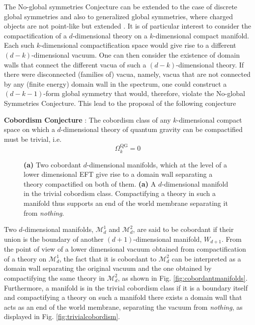 \documentclass[11pt,a4paper]{article}
\begin{document}
The No-global symmetries Conjecture can be extended to the case of discrete global symmetries and also to generalized global symmetries, where charged objects are not point-like but extended \cite{Gaiotto:2014kfa,Heidenreich:2020pkc,Heidenreich:2021tna}. It is of particular interest to consider the compactification of a $d$-dimensional theory on a $k$-dimensional compact manifold. Each such $k$-dimensional compactification space would give rise to a different $(d-k)$-dimensional  vacuum. One can then consider the existence of domain walls that connect the different vacua of such a $(d-k)$-dimensional theory. If there were disconnected (families of) vacua, namely, vacua that are not connected by any (finite energy) domain wall in the spectrum, one could construct a $(d-k-1)$-form global symmetry that would, therefore, violate the No-global Symmetries Conjecture. This lead to the proposal of the following conjecture 
\vspace{0.2cm}
\begin{tcolorbox}[colback=boxblue]
\textbf{Cobordism Conjecture} \cite{McNamara:2019rup}: The cobordism class of any $k$-dimensional compact space on which a $d$-dimensional theory of quantum gravity can be compactified must be trivial, i.e.
\begin{equation}
\Omega_k^{\mathrm{QG}}=0
\end{equation}
\end{tcolorbox}

\begin{figure}[t]
	\begin{center}
		\qquad \quad 
		\caption{\footnotesize \textbf{(a)} Two cobordant $d$-dimensional manifolds, which at the level of a lower dimensional EFT give rise to a domain wall separating a theory compactified on both of them. \textbf{(a)} A $d$-dimensional manifold in the trivial cobordism class. Compactifying a theory in such a manifold thus supports an end of the world membrane separating it from \emph{nothing}.}
	\end{center}
\end{figure}  


Two $d$-dimensional manifolds, $\mathcal{M}_d^1$ and $\mathcal{M}_d^2$, are said to be cobordant if their union is the boundary of another $(d+1)$-dimensional manifold, $W_{d+1}$. From the point of view of a lower dimensional vacuum obtained from compactification of a theory on $\mathcal{M}_d^1$, the fact that it is cobordant to $\mathcal{M}_d^2$ can be interpreted as a domain wall separating the original vacuum and the one obtained by compactifying the same theory in $\mathcal{M}_d^2$, as shown in Fig. \ref{fig:cobordantmanifolds}. Furthermore, a manifold is in the trivial cobordism class if it is a boundary itself and compactifying a theory on such a manifold there exists a domain wall that acts as an end of the world membrane, separating the vacuum from \emph{nothing}, as displayed in Fig. \ref{fig:trivialcobordism}. 
\end{document}
